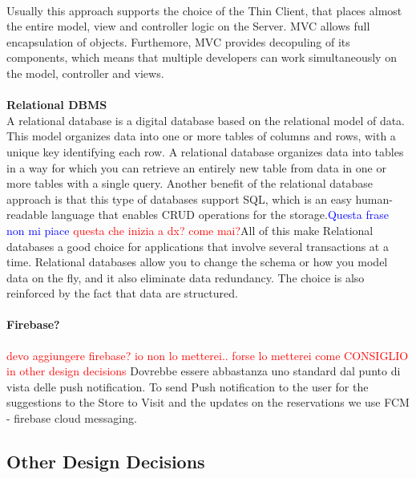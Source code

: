 \documentclass[a4paper, 12pt, oneside, table]{article}
\newcommand*{\lorenzo}[1]{\textcolor{BurntOrange}{#1}}
\newcommand{\yasmin}[1]{\textcolor{Red}{#1}}
\newcommand{\giovanni}[1]{\textcolor{Blue}{#1}}
\begin{document}
\\
Usually this approach 
supports the choice of the Thin Client, that places almost the entire model, view and controller logic on the Server. MVC allows full encapsulation of objects. Furthemore, MVC provides decopuling of its components, which means that multiple developers can work simultaneously on the model, controller and views.\\
\\
\textbf{Relational DBMS}\\
A relational database is a digital database based on the relational model of data. This model organizes data into one or more tables of columns and rows, with a unique key identifying each row. A relational database organizes data into tables in a way for which you can retrieve an entirely new table from data in one or more tables with a single query. Another benefit of the relational database approach is that this type of databases support SQL, which is an easy human-readable language that enables CRUD operations for the storage.\giovanni{Questa frase non mi piace} \yasmin{questa che inizia a dx? come mai?}All of this make Relational databases a good choice for applications that involve several transactions at a time. Relational databases allow you to change the schema or how you model data on the fly, and it also eliminate data redundancy. The choice is also reinforced by the fact that data are structured.
\\
\paragraph{Firebase?}
\yasmin{devo aggiungere firebase? io non lo metterei.. forse lo metterei come CONSIGLIO in other design decisions} \lorenzo{Dovrebbe essere abbastanza uno standard dal punto di vista delle push notification.}
To send Push notification to the user for the suggestions to the Store to Visit and the updates on the reservations we use FCM - firebase cloud messaging.

\subsection{Other Design Decisions}
\end{document}
